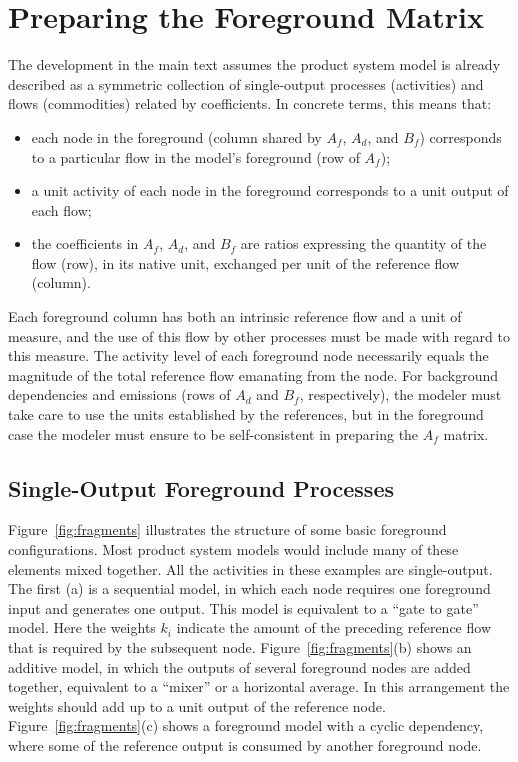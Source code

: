 \section{Preparing the Foreground Matrix}

The development in the main text assumes the product system model is already described as a symmetric collection of single-output processes (activities) and flows (commodities) related by coefficients.  In concrete terms, this means that:
\begin{itemize}
\item each node in the foreground (column shared by $A_f$, $A_d$, and $B_f$) corresponds to a particular flow in the model's foreground (row of $A_f$);
\item a unit activity of each node in the foreground corresponds to a unit output of each flow;
\item the coefficients in $A_f$, $A_d$, and $B_f$ are ratios expressing the quantity of the flow (row), in its native unit, exchanged per unit of the reference flow (column). 
\end{itemize}

Each foreground column has both an intrinsic reference flow and a unit of measure, and the use of this flow by other processes must be made with regard to this measure.  The activity level of each foreground node necessarily equals the magnitude of the total reference flow emanating from the node.  For background dependencies and emissions (rows of $A_d$ and $B_f$, respectively), the modeler must take care to use the units established by the references, but in the foreground case the modeler must ensure to be self-consistent in preparing the $A_f$ matrix. 


\subsection{Single-Output Foreground Processes}



Figure~\ref{fig:fragments} illustrates the structure of some basic foreground configurations.  Most product system models would include many of these elements mixed together.  All the activities in these examples are single-output.
The first (a) is a sequential model, in which each node requires one foreground input and generates one output. This model is equivalent to a ``gate to gate'' model.  Here the weights $k_i$ indicate the amount of the preceding reference flow that is required by the subsequent node.  Figure~\ref{fig:fragments}(b) shows an additive model, in which the outputs of several foreground nodes are added together, equivalent to a ``mixer'' or a horizontal average.  In this arrangement the weights %
should add up to a unit output of the reference node.  Figure~\ref{fig:fragments}(c) shows a foreground model with a cyclic dependency, where some of the reference output is consumed by another foreground node.

